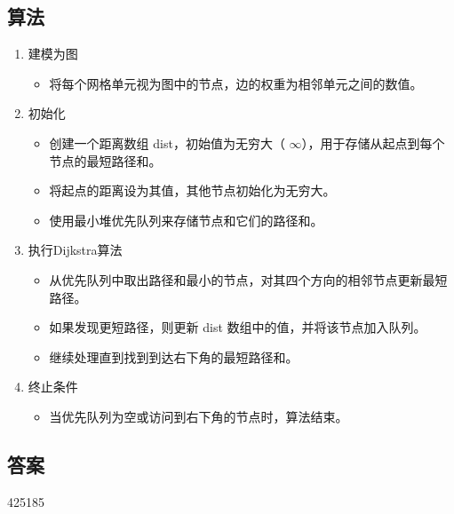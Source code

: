 \subsection{算法}
\begin{enumerate}
	\item 建模为图
	      \begin{itemize}
		      \item 将每个网格单元视为图中的节点，边的权重为相邻单元之间的数值。
	      \end{itemize}
	\item	初始化
	      \begin{itemize}
		      \item 创建一个距离数组 dist，初始值为无穷大（ \( \infty \)），用于存储从起点到每个节点的最短路径和。
		      \item 将起点的距离设为其值，其他节点初始化为无穷大。
		      \item 使用最小堆优先队列来存储节点和它们的路径和。
	      \end{itemize}

	\item	执行Dijkstra算法
	      \begin{itemize}
		      \item 从优先队列中取出路径和最小的节点，对其四个方向的相邻节点更新最短路径。
		      \item 如果发现更短路径，则更新 dist 数组中的值，并将该节点加入队列。
		      \item 继续处理直到找到到达右下角的最短路径和。
	      \end{itemize}

	\item	终止条件
	      \begin{itemize}
		      \item 当优先队列为空或访问到右下角的节点时，算法结束。
	      \end{itemize}
\end{enumerate}

\subsection{答案}
425185
